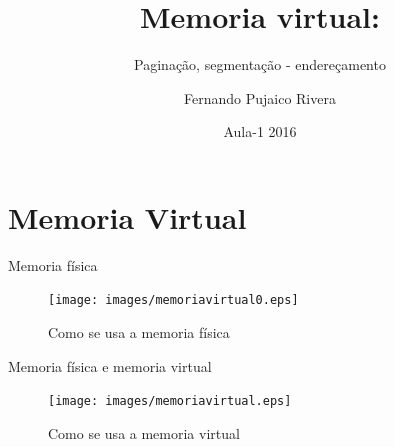 \documentclass[envcountsect,dvips]{beamer}
\begin{document}
\title[Memoria virtual:   ] %
{Memoria virtual:}
\subtitle{Paginação, segmentação - endereçamento}
\author[Fernando] %
{Fernando Pujaico Rivera}
\date[2016] %
{Aula-1 2016}
\subject{Computer Science}
\frame{\titlepage}

\section{Memoria Virtual}

\begin{frame}{Memoria física \cite{arq}}
\begin{figure}
\centering
\texttt{[image: images/memoriavirtual0.eps]}
\caption{Como se usa a memoria física}
\label{fig:memoria0}
\end{figure}
\end{frame}

\begin{frame}{Memoria física e memoria virtual}
\begin{figure}
\centering
\texttt{[image: images/memoriavirtual.eps]}
\caption{Como se usa a memoria virtual}
\label{fig:memoria}
\end{figure}
\end{frame}
\end{document}
